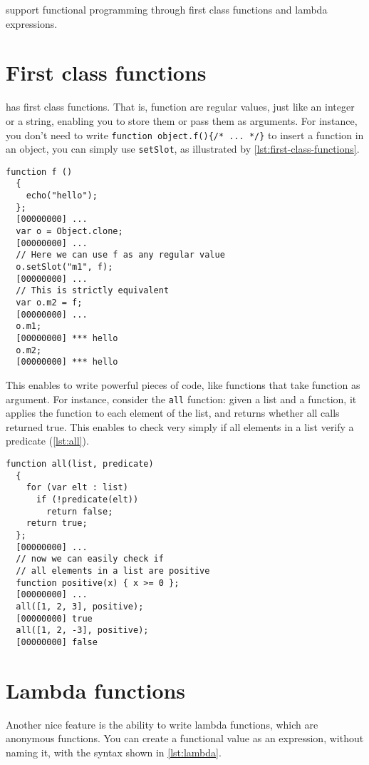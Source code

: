 \documentclass[openright,twoside,12pt]{report}
\begin{document}
\urbi support functional programming through first class functions and
lambda expressions.

\section{First class functions}

\urbi has first class functions. That is, function are regular values,
just like an integer or a string, enabling you to store them or pass
them as arguments. For instance, you don't need to write
\lstinline|function object.f(){/* ... */}| to insert a function in an
object, you can simply use \texttt{setSlot}, as illustrated by
\autoref{lst:first-class-functions}.

\begin{lstlisting}[caption=First class functions,
  label=lst:first-class-functions]
  function f ()
  {
    echo("hello");
  };
  [00000000] ...
  var o = Object.clone;
  [00000000] ...
  // Here we can use f as any regular value
  o.setSlot("m1", f);
  [00000000] ...
  // This is strictly equivalent
  var o.m2 = f;
  [00000000] ...
  o.m1;
  [00000000] *** hello
  o.m2;
  [00000000] *** hello
\end{lstlisting}

This enables to write powerful pieces of code, like functions that
take function as argument. For instance, consider the \texttt{all}
function: given a list and a function, it applies the function to each
element of the list, and returns whether all calls returned true. This
enables to check very simply if all elements in a list verify a
predicate (\autoref{lst:all}).

\begin{lstlisting}[caption=Functional programming: the \texttt{all}
  function, label=lst:all]
  function all(list, predicate)
  {
    for (var elt : list)
      if (!predicate(elt))
        return false;
    return true;
  };
  [00000000] ...
  // now we can easily check if
  // all elements in a list are positive
  function positive(x) { x >= 0 };
  [00000000] ...
  all([1, 2, 3], positive);
  [00000000] true
  all([1, 2, -3], positive);
  [00000000] false
\end{lstlisting}

\section{Lambda functions}

Another nice feature is the ability to write lambda functions, which
are anonymous functions. You can create a functional value as an
expression, without naming it, with the syntax shown in \autoref{lst:lambda}.
\end{document}
